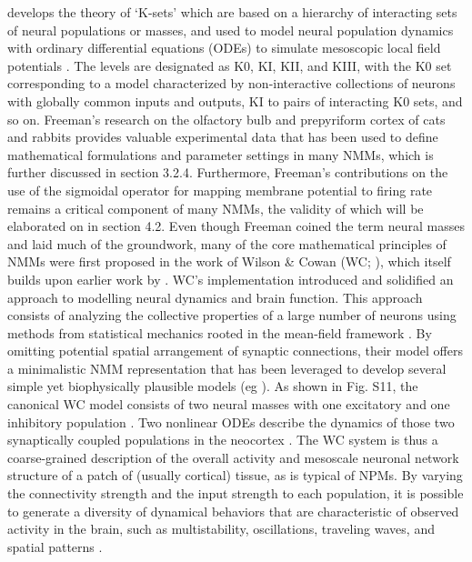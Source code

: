 \documentclass[12pt,twoside]{article}
\begin{document}
develops the theory of `K-sets' which are based on a hierarchy of interacting sets of neural populations or masses, and used to model neural population dynamics with ordinary differential equations (ODEs) to simulate mesoscopic local field potentials \citep{deschle2021validity}. The levels are designated as K0, KI, KII, and KIII, with the K0 set corresponding to a model characterized by non-interactive collections of neurons with globally common inputs and outputs, KI to pairs of interacting K0 sets, and so on. Freeman's research on the olfactory bulb and prepyriform cortex of cats and rabbits \citep{freeman1979nonlinear, freeman1975mass} provides valuable experimental data that has been used to define mathematical formulations and parameter settings in many NMMs, which is further discussed in section 3.2.4. Furthermore, Freeman's contributions on the use of the sigmoidal operator for mapping membrane potential to firing rate remains a critical component of many NMMs, the validity of which will be elaborated on in section 4.2. Even though Freeman coined the term neural masses and laid much of the groundwork, many of the core mathematical principles of NMMs were first proposed in the work of Wilson \& Cowan (WC; \citealp{wilson1972excitatory}), which itself builds upon earlier work by \citet{beurle1956properties}. WC's implementation introduced and solidified an approach to modelling neural dynamics and brain function. This approach consists of analyzing the collective properties of a large number of neurons using methods from statistical mechanics rooted in the mean-field framework \citep{destexhe2009wilson,chow2020before}. By omitting potential spatial arrangement of synaptic connections, their model offers a minimalistic NMM representation that has been leveraged to develop several simple yet biophysically plausible models (eg \citealp{Kilpatrick2013, sanz2015mathematical}). As shown in Fig. S11, the canonical WC model consists of two neural masses with one excitatory and one inhibitory population \citep{wilson1972excitatory,sanz2015mathematical}. Two nonlinear ODEs describe the dynamics of those two synaptically coupled populations in the neocortex \citep{nakagawa2014delays,cowan2016wilson}. The WC system is thus a coarse-grained description of the overall activity and mesoscale neuronal network structure of a patch of (usually cortical) tissue, as is typical of NPMs. By varying the connectivity strength and the input strength to each population, it is possible to generate a diversity of dynamical behaviors that are characteristic of observed activity in the brain, such as multistability, oscillations, traveling waves, and spatial patterns \citep{Kilpatrick2013}. 
\end{document}
